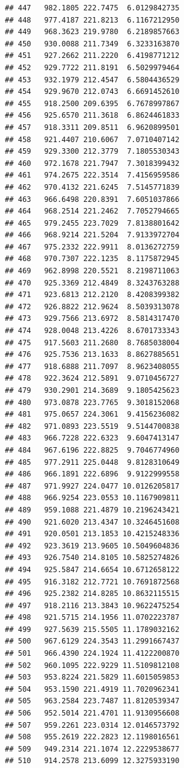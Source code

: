 \documentclass[
]{article}
\begin{document}
\begin{verbatim}
## 447   982.1805 222.7475  6.0129842735
## 448   977.4187 221.8213  6.1167212950
## 449   968.3623 219.9780  6.2189857663
## 450   930.0088 211.7349  6.3233163870
## 451   927.2662 211.2220  6.4198771212
## 452   929.7722 211.8191  6.5029979464
## 453   932.1979 212.4547  6.5804436529
## 454   929.9670 212.0743  6.6691452610
## 455   918.2500 209.6395  6.7678997867
## 456   925.6570 211.3618  6.8624461833
## 457   918.3311 209.8511  6.9620899501
## 458   921.4407 210.6067  7.0710407142
## 459   929.3300 212.3779  7.1805530343
## 460   972.1678 221.7947  7.3018399432
## 461   974.2675 222.3514  7.4156959586
## 462   970.4132 221.6245  7.5145771839
## 463   966.6498 220.8391  7.6051037866
## 464   968.2514 221.2462  7.7052794665
## 465   979.2455 223.7029  7.8138801642
## 466   968.9214 221.5204  7.9133972704
## 467   975.2332 222.9911  8.0136272759
## 468   970.7307 222.1235  8.1175872945
## 469   962.8998 220.5521  8.2198711063
## 470   925.3369 212.4849  8.3243763288
## 471   923.6813 212.2120  8.4208399382
## 472   926.8822 212.9624  8.5039313078
## 473   929.7566 213.6972  8.5814317470
## 474   928.0048 213.4226  8.6701733343
## 475   917.5603 211.2680  8.7685038004
## 476   925.7536 213.1633  8.8627885651
## 477   918.6888 211.7097  8.9623408055
## 478   922.3624 212.5891  9.0710456727
## 479   930.2901 214.3689  9.1805425623
## 480   973.0878 223.7765  9.3018152068
## 481   975.0657 224.3061  9.4156236082
## 482   971.0893 223.5519  9.5144700838
## 483   966.7228 222.6323  9.6047413147
## 484   967.6196 222.8825  9.7046774960
## 485   977.2911 225.0448  9.8128310649
## 486   966.1891 222.6896  9.9122999558
## 487   971.9927 224.0477 10.0126205817
## 488   966.9254 223.0553 10.1167909811
## 489   959.1088 221.4879 10.2196243421
## 490   921.6020 213.4347 10.3246451608
## 491   920.0501 213.1853 10.4215248336
## 492   923.3619 213.9605 10.5049604836
## 493   926.7540 214.8105 10.5825274826
## 494   925.5847 214.6654 10.6712658122
## 495   916.3182 212.7721 10.7691872568
## 496   925.2382 214.8285 10.8632115515
## 497   918.2116 213.3843 10.9622475254
## 498   921.5715 214.1956 11.0702223787
## 499   927.5639 215.5505 11.1789032162
## 500   967.6129 224.3543 11.2991667437
## 501   966.4390 224.1924 11.4122200870
## 502   960.1095 222.9229 11.5109812108
## 503   953.8224 221.5829 11.6015059853
## 504   953.1590 221.4919 11.7020962341
## 505   963.2584 223.7487 11.8120539347
## 506   952.5014 221.4701 11.9130956608
## 507   959.2261 223.0314 12.0146573792
## 508   955.2619 222.2823 12.1198016561
## 509   949.2314 221.1074 12.2229538677
## 510   914.2578 213.6099 12.3275933190

\end{verbatim}
\end{document}
